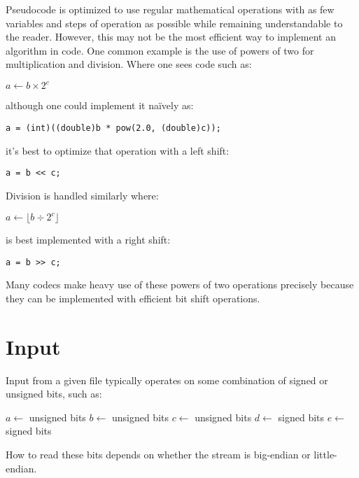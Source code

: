 Pseudocode is optimized to use regular mathematical operations
with as few variables and steps of operation as possible
while remaining understandable to the reader.
However, this may not be the most efficient way to implement
an algorithm in code.
One common example is the use of powers of two for multiplication
and division.
Where one sees code such as:
\begin{algorithm}[H]
  \DontPrintSemicolon
  $a \leftarrow b \times 2 ^ c$\;
\end{algorithm}
\par
\noindent
although one could implement it na\"ively as:
\begin{Verbatim}[xleftmargin=.25in]
a = (int)((double)b * pow(2.0, (double)c));
\end{Verbatim}
\par
\noindent
it's best to optimize that operation with a left shift:
\begin{Verbatim}[xleftmargin=.25in]
a = b << c;
\end{Verbatim}
\par
\noindent
Division is handled similarly where:
\par
\noindent
\begin{algorithm}[H]
  \DontPrintSemicolon
  $a \leftarrow \lfloor b \div 2 ^ c \rfloor$\;
\end{algorithm}
\par
\noindent
is best implemented with a right shift:
\begin{Verbatim}[xleftmargin=.25in]
a = b >> c;
\end{Verbatim}
\par
\noindent
Many codecs make heavy use of these powers of two operations
precisely because they can be implemented with
efficient bit shift operations.

\clearpage

\section{Input}

Input from a given file typically operates on some
combination of signed or unsigned bits, such as:
\par
\noindent
\begin{algorithm}[H]
  \DontPrintSemicolon
  $a \leftarrow$  unsigned bits\;
  $b \leftarrow$  unsigned bits\;
  $c \leftarrow$  unsigned bits\;
  $d \leftarrow$  signed bits\;
  $e \leftarrow$  signed bits\;
\end{algorithm}
\par
\noindent
How to read these bits depends on whether the stream is
big-endian or little-endian.

